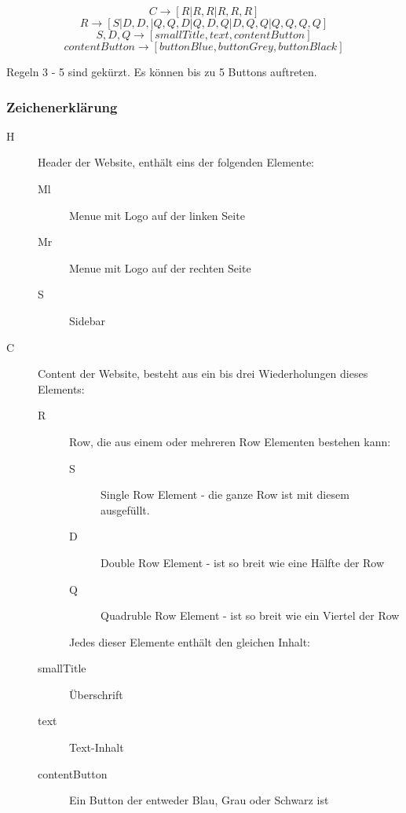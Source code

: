 \documentclass[pdftex,a4paper,halfparskip, article]{scrartcl}
\begin{document}
\begin{equation}
C \rightarrow [R | R, R | R, R, R ]
\end{equation}
\begin{equation}
R \rightarrow [S | D, D, | Q, Q, D | Q, D, Q | D, Q, Q | Q, Q, Q, Q]
\end{equation}
\begin{equation}
S, D, Q \rightarrow [smallTitle, text, contentButton]
\end{equation}
\begin{equation}
contentButton \rightarrow [buttonBlue, buttonGrey, buttonBlack]
\end{equation}

Regeln 3 - 5 sind gekürzt. Es können bis zu 5 Buttons auftreten.

\subsubsection{Zeichenerklärung}

\begin{description}
	\item[H] Header der Website, enthält eins der folgenden Elemente: 
	\begin{description}
		\item[Ml] Menue mit Logo auf der linken Seite
		\item[Mr] Menue mit Logo auf der rechten Seite
		\item[S] Sidebar	
	\end{description}
	\item[C] Content der Website, besteht aus ein bis drei Wiederholungen dieses Elements:
	\begin{description}
		\item[R] Row, die aus einem oder mehreren Row Elementen bestehen kann:
		\begin{description}
			\item[S] Single Row Element - die ganze Row ist mit diesem ausgefüllt.
			\item[D] Double Row Element - ist so breit wie eine Hälfte der Row
			\item[Q] Quadruble Row Element - ist so breit wie ein Viertel der Row
		\end{description}
		Jedes dieser Elemente enthält den gleichen Inhalt:
		\item[smallTitle] Überschrift
		\item[text] Text-Inhalt
		\item[contentButton] Ein Button der entweder Blau, Grau oder Schwarz ist 
	\end{description}
\end{description}
\end{document}
